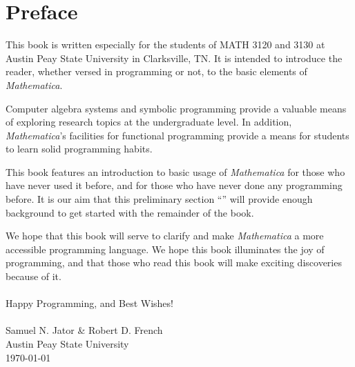 \chapter*{Preface}

This book is written especially for the students of MATH 3120 and 3130 at Austin Peay State University in Clarksville, TN. It is intended to introduce the reader, whether versed in programming or not, to the basic elements of \emph{Mathematica}.

Computer algebra systems and symbolic programming provide a valuable means of exploring research topics at the undergraduate level. In addition, \emph{Mathematica}'s facilities for functional programming provide a means for students to learn solid programming habits.

This book features an introduction to basic usage of \emph{Mathematica} for those who have never used it before, and for those who have never done any programming before. It is our aim that this preliminary section ``'' will provide enough background to get started with the remainder of the book.

We hope that this book will serve to clarify and make \emph{Mathematica} a more accessible programming language. We hope this book illuminates the joy of programming, and that those who read this book will make exciting discoveries because of it.\\
\\
Happy Programming, and Best Wishes!\\
\\
Samuel N. Jator \& Robert D. French\\
Austin Peay State University\\
\today
